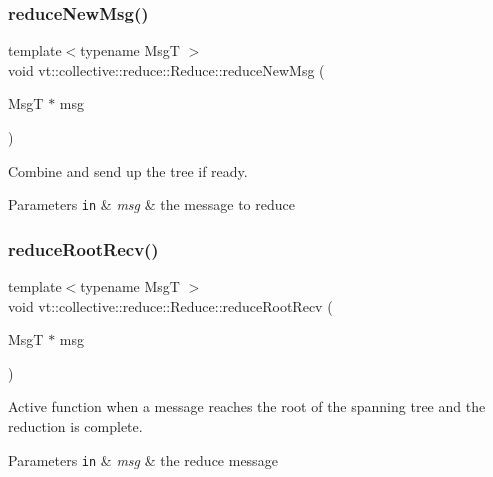 \subsubsection{\texorpdfstring{reduce\+New\+Msg()}{reduceNewMsg()}}
{\footnotesize\ttfamily template$<$typename MsgT $>$ \\
void vt\+::collective\+::reduce\+::\+Reduce\+::reduce\+New\+Msg (\begin{DoxyParamCaption}\item[{MsgT $\ast$}]{msg }\end{DoxyParamCaption})}



Combine and send up the tree if ready. 


\begin{DoxyParams}[1]{Parameters}
\mbox{\tt in}  & {\em msg} & the message to reduce \\
\hline
\end{DoxyParams}
\mbox{\label{structvt_1_1collective_1_1reduce_1_1_reduce_a48c7bb604fade1b64b9b391f4091ad5b}} 
\subsubsection{\texorpdfstring{reduce\+Root\+Recv()}{reduceRootRecv()}}
{\footnotesize\ttfamily template$<$typename MsgT $>$ \\
void vt\+::collective\+::reduce\+::\+Reduce\+::reduce\+Root\+Recv (\begin{DoxyParamCaption}\item[{MsgT $\ast$}]{msg }\end{DoxyParamCaption})}



Active function when a message reaches the root of the spanning tree and the reduction is complete. 


\begin{DoxyParams}[1]{Parameters}
\mbox{\tt in}  & {\em msg} & the reduce message \\
\hline
\end{DoxyParams}
\mbox{\label{structvt_1_1collective_1_1reduce_1_1_reduce_af5e5d5538739578f2a1a23ea5a980e40}} 
